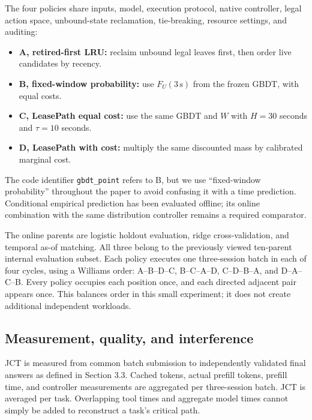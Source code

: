 \documentclass[sigconf, screen, review]{acmart}
\providecommand{\tightlist}{\setlength{\itemsep}{0pt}\setlength{\parskip}{0pt}}
\begin{document}
The four policies share inputs, model, execution protocol, native
controller, legal action space, unbound-state reclamation, tie-breaking,
resource settings, and auditing:

\begin{itemize}
\tightlist
\item
  \textbf{A, retired-first LRU:} reclaim unbound legal leaves first,
  then order live candidates by recency.
\item
  \textbf{B, fixed-window probability:} use \(F_U(3\,\mathrm{s})\) from
  the frozen GBDT, with equal costs.
\item
  \textbf{C, LeasePath equal cost:} use the same GBDT and \(W\) with
  \(H=30\) seconds and \(\tau=10\) seconds.
\item
  \textbf{D, LeasePath with cost:} multiply the same discounted mass by
  calibrated marginal cost.
\end{itemize}

The code identifier \nolinkurl{gbdt_point} refers to B, but we use
``fixed-window probability'' throughout the paper to avoid confusing it
with a time prediction. Conditional empirical prediction has been
evaluated offline; its online combination with the same distribution
controller remains a required comparator.

The online parents are logistic holdout evaluation, ridge
cross-validation, and temporal as-of matching. All three belong to the
previously viewed ten-parent internal evaluation subset. Each policy
executes one three-session batch in each of four cycles, using a
Williams order: A--B--D--C, B--C--A--D, C--D--B--A, and D--A--C--B.
Every policy occupies each position once, and each directed adjacent
pair appears once. This balances order in this small experiment; it does
not create additional independent workloads.

\subsection{Measurement, quality, and
interference}\label{measurement-quality-and-interference}

JCT is measured from common batch submission to independently validated
final answers as defined in Section 3.3. Cached tokens, actual prefill
tokens, prefill time, and controller measurements are aggregated per
three-session batch. JCT is averaged per task. Overlapping tool times
and aggregate model times cannot simply be added to reconstruct a task's
critical path.
\end{document}
